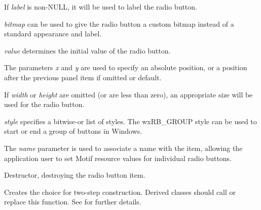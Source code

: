 If {\it label} is non-NULL, it will be used to label the radio button.

{\it bitmap} can be used to give the radio button a custom bitmap
instead of a standard appearance and label.

{\it value} determines the initial value of the radio button.

The parameters {\it x} and {\it y} are used to specify an absolute
position, or a position after the previous panel item if omitted or
default.

If {\it width} or {\it height} are omitted (or are less than zero), an
appropriate size will be used for the radio button.

{\it style} specifies a bitwise-or list of styles. The wxRB\_GROUP style
can be used to start or end a group of buttons in Windows.

The {\it name} parameter is used to associate a name with the item,
allowing the application user to set Motif resource values for
individual radio buttons.



Destructor, destroying the radio button item.




Creates the choice for two-step construction. Derived classes
should call or replace this function. See 
for further details.



